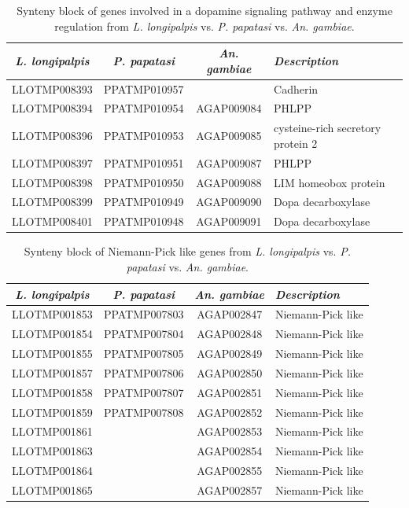 \begin{table}[H]
  \centering
  \begin{tabular}{c c c l} \hline
    \emph{L. longipalpis} & \emph{P. papatasi} & \emph{An. gambiae} & \emph{Description} \\ \hline
    LLOTMP008393 & PPATMP010957 & & Cadherin \\
    LLOTMP008394 & PPATMP010954 & AGAP009084 & PHLPP \\
    LLOTMP008396 & PPATMP010953 & AGAP009085 & cysteine-rich secretory protein 2 \\
    LLOTMP008397 & PPATMP010951 & AGAP009087 & PHLPP \\
    LLOTMP008398 & PPATMP010950 & AGAP009088 & LIM homeobox protein \\
    LLOTMP008399 & PPATMP010949 & AGAP009090 & Dopa decarboxylase \\
    LLOTMP008401 & PPATMP010948 & AGAP009091 & Dopa decarboxylase
    \end{tabular}
    \caption{Synteny block of genes involved in a dopamine signaling pathway and enzyme regulation from \emph{L. longipalpis} vs. \emph{P. papatasi} vs. \emph{An. gambiae}.}
  \label{tab:synteny-three-way-dopamine}
\end{table}

\begin{table}[H]
  \centering
  \begin{tabular}{c c c l} \hline
    \emph{L. longipalpis} & \emph{P. papatasi} & \emph{An. gambiae} & \emph{Description} \\ \hline
    LLOTMP001853 & PPATMP007803 & AGAP002847 & Niemann-Pick like \\
    LLOTMP001854 & PPATMP007804 & AGAP002848 & Niemann-Pick like \\
    LLOTMP001855 & PPATMP007805 & AGAP002849 & Niemann-Pick like \\
    LLOTMP001857 & PPATMP007806 & AGAP002850 & Niemann-Pick like \\
    LLOTMP001858 & PPATMP007807 & AGAP002851 & Niemann-Pick like \\
    LLOTMP001859 & PPATMP007808 & AGAP002852 & Niemann-Pick like \\
    LLOTMP001861 & & AGAP002853 & Niemann-Pick like \\
    LLOTMP001863 & & AGAP002854 & Niemann-Pick like \\
    LLOTMP001864 & & AGAP002855 & Niemann-Pick like \\
    LLOTMP001865 & & AGAP002857 & Niemann-Pick like
    \end{tabular}
    \caption{Synteny block of Niemann-Pick like genes from \emph{L. longipalpis} vs. \emph{P. papatasi} vs. \emph{An. gambiae}.}
  \label{tab:synteny-three-way-npc2}
\end{table}

